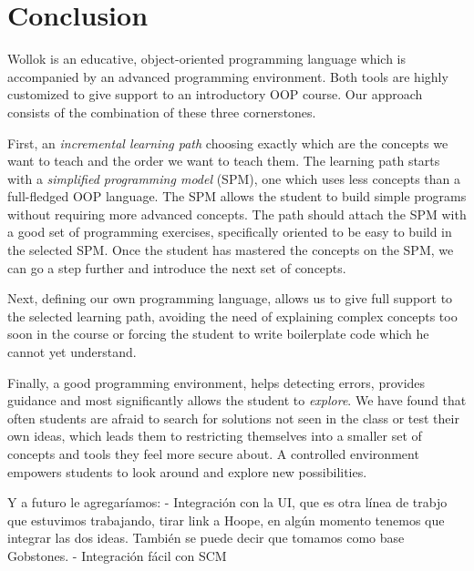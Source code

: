 \section{Conclusion}
\label{sec:conclusion}



Wollok is an educative, object-oriented programming language which is accompanied by an advanced programming environment.
Both tools are highly customized to give support to an introductory OOP course.
Our approach consists of the combination of these three cornerstones.

First, an \emph{incremental learning path} choosing exactly which are the concepts we want to teach and the order we want to teach them.
The learning path starts with a \emph{simplified programming model} (SPM), \ie one which uses less concepts than a full-fledged OOP language.
The SPM allows the student to build simple programs without requiring more advanced concepts.
The path should attach the SPM with a good set of programming exercises, specifically oriented to be easy to build in the selected SPM.
Once the student has mastered the concepts on the SPM, we can go a step further and introduce the next set of concepts.

Next, defining our own programming language, allows us to give full support to the selected learning path, 
avoiding the need of explaining complex concepts too soon in the course or forcing the student to write boilerplate code which he cannot yet understand.

Finally, a good programming environment, helps detecting errors, provides guidance and most significantly allows the student to \emph{explore}.
We have found that often students are afraid to search for solutions not seen in the class or test their own ideas, 
which leads them to restricting themselves into a smaller set of concepts and tools they feel more secure about.
A controlled environment empowers students to look around and explore new possibilities.

\medskip


\label{sec:furtherWork}
Y a futuro le agregaríamos:
- Integración con la UI, que es otra línea de trabjo que estuvimos trabajando, tirar link a Hoope, en algún momento tenemos que integrar las dos ideas. También se puede decir que tomamos como base Gobstones.
- Integración fácil con SCM

